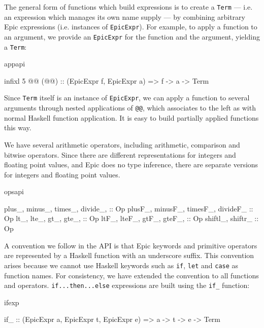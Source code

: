 The general form of functions which build expressions is to create a
\texttt{Term} --- i.e. an expression which manages its own name supply
--- by combining arbitrary Epic expressions (i.e. instances of
\texttt{EpicExpr}). For example, to apply a function to an argument,
we provide an \texttt{EpicExpr} for the function and the argument,
yielding a \texttt{Term}:

\begin{SaveVerbatim}{appapi}

infixl 5 @@
(@@) :: (EpicExpr f, EpicExpr a) => f -> a -> Term

\end{SaveVerbatim}

Since \texttt{Term} itself is an instance of \texttt{EpicExpr}, we can
apply a function to several arguments through nested applications of
\texttt{@@}, which associates to the left as with normal Haskell
function application. It is easy to build partially applied functions
this way. 


We have several arithmetic operators, including arithmetic, comparison
and bitwise operators. Since there are different representations for
integers and floating point values, and Epic does no type inference,
there are separate versions for integers and floating point values.

\begin{SaveVerbatim}{opsapi}

plus_, minus_, times_, divide_,    :: Op
plusF_, minusF_, timesF_, divideF_ :: Op
lt_, lte_, gt_, gte_,              :: Op
ltF_, lteF_, gtF_, gteF_,          :: Op
shiftl_, shiftr_                   :: Op

\end{SaveVerbatim}

A convention we follow in the API is that Epic keywords and primitive
operators are represented by a Haskell function with an underscore
suffix. This convention arises because we cannot use Haskell keywords
such as \texttt{if}, \texttt{let} and \texttt{case} as function names.
For consistency, we have extended the convention to all functions and
operators. \texttt{if...then...else} expressions are built using the
\texttt{if\_} function:

\begin{SaveVerbatim}{ifexp}

if_ :: (EpicExpr a, EpicExpr t, EpicExpr e) =>
       a -> t -> e -> Term

\end{SaveVerbatim}

